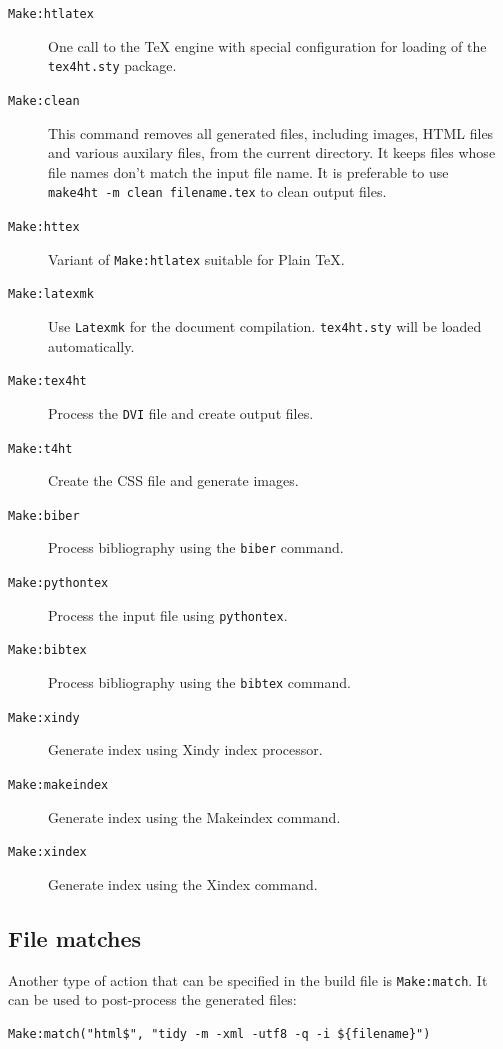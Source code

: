 \begin{description}
\item[\texttt{Make:htlatex}]
One call to the TeX engine with special configuration for loading of the
\texttt{tex4ht.sty} package.
\item[\texttt{Make:clean}]
This command removes all generated files, including images, HTML files
and various auxilary files, from the current directory. It keeps files
whose file names don't match the input file name. It is preferable to
use \texttt{make4ht\ -m\ clean\ filename.tex} to clean output files.
\item[\texttt{Make:httex}]
Variant of \texttt{Make:htlatex} suitable for Plain \TeX.
\item[\texttt{Make:latexmk}]
Use \texttt{Latexmk} for the document compilation. \texttt{tex4ht.sty}
will be loaded automatically.
\item[\texttt{Make:tex4ht}]
Process the \texttt{DVI} file and create output files.
\item[\texttt{Make:t4ht}]
Create the CSS file and generate images.
\item[\texttt{Make:biber}]
Process bibliography using the \texttt{biber} command.
\item[\texttt{Make:pythontex}]
Process the input file using \texttt{pythontex}.
\item[\texttt{Make:bibtex}]
Process bibliography using the \texttt{bibtex} command.
\item[\texttt{Make:xindy}]
Generate index using Xindy index processor.
\item[\texttt{Make:makeindex}]
Generate index using the Makeindex command.
\item[\texttt{Make:xindex}]
Generate index using the Xindex command.
\end{description}

\subsection{File matches}\label{file-matches}

\label{sec:postprocessing}

Another type of action that can be specified in the build file is
\texttt{Make:match}. It can be used to post-process the generated files:

\begin{verbatim}
Make:match("html$", "tidy -m -xml -utf8 -q -i ${filename}")
\end{verbatim}

